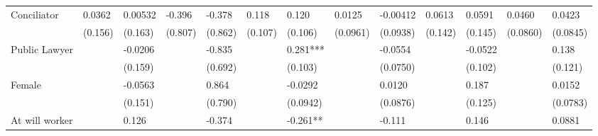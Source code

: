 \begin{tabular}{rrrrrrrrrrrrr}
\multicolumn{1}{l}{Conciliator} & \multicolumn{1}{l}{0.0362} & \multicolumn{1}{l}{0.00532} & \multicolumn{1}{l}{-0.396} & \multicolumn{1}{l}{-0.378} & \multicolumn{1}{l}{0.118} & \multicolumn{1}{l}{0.120} & \multicolumn{1}{l}{0.0125} & \multicolumn{1}{l}{-0.00412} & \multicolumn{1}{l}{0.0613} & \multicolumn{1}{l}{0.0591} & \multicolumn{1}{l}{0.0460} & \multicolumn{1}{l}{0.0423} \\
\multicolumn{1}{l}{} & \multicolumn{1}{l}{(0.156)} & \multicolumn{1}{l}{(0.163)} & \multicolumn{1}{l}{(0.807)} & \multicolumn{1}{l}{(0.862)} & \multicolumn{1}{l}{(0.107)} & \multicolumn{1}{l}{(0.106)} & \multicolumn{1}{l}{(0.0961)} & \multicolumn{1}{l}{(0.0938)} & \multicolumn{1}{l}{(0.142)} & \multicolumn{1}{l}{(0.145)} & \multicolumn{1}{l}{(0.0860)} & \multicolumn{1}{l}{(0.0845)} \\
\multicolumn{1}{l}{Public Lawyer} & \multicolumn{1}{l}{} & \multicolumn{1}{l}{-0.0206} & \multicolumn{1}{l}{} & \multicolumn{1}{l}{-0.835} & \multicolumn{1}{l}{} & \multicolumn{1}{l}{0.281***} & \multicolumn{1}{l}{} & \multicolumn{1}{l}{-0.0554} & \multicolumn{1}{l}{} & \multicolumn{1}{l}{-0.0522} & \multicolumn{1}{l}{} & \multicolumn{1}{l}{0.138} \\
\multicolumn{1}{l}{} & \multicolumn{1}{l}{} & \multicolumn{1}{l}{(0.159)} & \multicolumn{1}{l}{} & \multicolumn{1}{l}{(0.692)} & \multicolumn{1}{l}{} & \multicolumn{1}{l}{(0.103)} & \multicolumn{1}{l}{} & \multicolumn{1}{l}{(0.0750)} & \multicolumn{1}{l}{} & \multicolumn{1}{l}{(0.102)} & \multicolumn{1}{l}{} & \multicolumn{1}{l}{(0.121)} \\
\multicolumn{1}{l}{Female} & \multicolumn{1}{l}{} & \multicolumn{1}{l}{-0.0563} & \multicolumn{1}{l}{} & \multicolumn{1}{l}{0.864} & \multicolumn{1}{l}{} & \multicolumn{1}{l}{-0.0292} & \multicolumn{1}{l}{} & \multicolumn{1}{l}{0.0120} & \multicolumn{1}{l}{} & \multicolumn{1}{l}{0.187} & \multicolumn{1}{l}{} & \multicolumn{1}{l}{0.0152} \\
\multicolumn{1}{l}{} & \multicolumn{1}{l}{} & \multicolumn{1}{l}{(0.151)} & \multicolumn{1}{l}{} & \multicolumn{1}{l}{(0.790)} & \multicolumn{1}{l}{} & \multicolumn{1}{l}{(0.0942)} & \multicolumn{1}{l}{} & \multicolumn{1}{l}{(0.0876)} & \multicolumn{1}{l}{} & \multicolumn{1}{l}{(0.125)} & \multicolumn{1}{l}{} & \multicolumn{1}{l}{(0.0783)} \\
\multicolumn{1}{l}{At will worker} & \multicolumn{1}{l}{} & \multicolumn{1}{l}{0.126} & \multicolumn{1}{l}{} & \multicolumn{1}{l}{-0.374} & \multicolumn{1}{l}{} & \multicolumn{1}{l}{-0.261**} & \multicolumn{1}{l}{} & \multicolumn{1}{l}{-0.111} & \multicolumn{1}{l}{} & \multicolumn{1}{l}{0.146} & \multicolumn{1}{l}{} & \multicolumn{1}{l}{0.0881} \\

\end{tabular}
